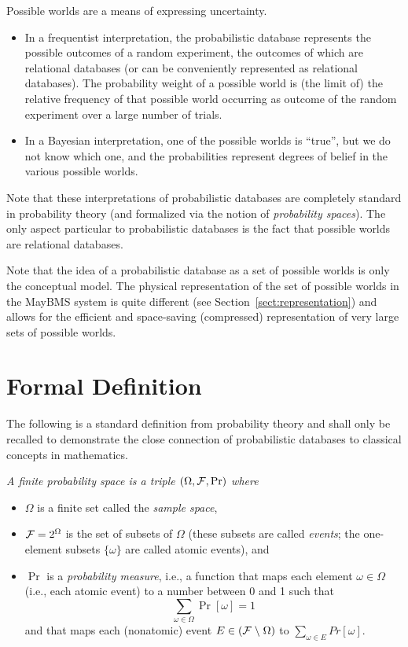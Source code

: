 Possible worlds are a means of expressing uncertainty.
\begin{itemize}
\item
In a frequentist interpretation, the probabilistic database represents the
possible outcomes of a random experiment, the outcomes of which are relational
databases (or can be conveniently represented as relational databases).
The probability weight of a possible world is (the limit of) the relative
frequency of that possible world occurring as outcome of the random experiment
over a large number of trials.

\item
In a Bayesian interpretation, one of the possible worlds is
``true'', but we do not know which one, and the probabilities represent
degrees of belief in the various possible worlds.
\end{itemize}

Note that these interpretations of probabilistic databases are completely
standard in probability theory (and formalized via the notion of {\em probability spaces}). The only aspect particular to probabilistic
databases is the fact that possible worlds are relational databases.


Note that the idea of a probabilistic database as a set of possible worlds
is only the conceptual model. The physical representation of the
set of possible worlds in the MayBMS system is quite different
(see Section~\ref{sect:representation}) and allows for the efficient and
space-saving (compressed) representation of very large sets of possible
worlds.


\section{Formal Definition}


The following is a standard definition from probability theory and
shall only be recalled to demonstrate the close connection of
probabilistic databases to classical concepts in mathematics.


\begin{definition}\em
A {\em finite probability space}\/ is a triple $(\Omega, {\cal F}, \Pr)$ where
\begin{itemize}
\item
$\Omega$ is a finite set called the {\em sample space}\/,

\item
${\cal F} = 2^\Omega$ is the set of
subsets of $\Omega$ (these subsets are called {\em events}; the one-element subsets $\{\omega\}$ are called atomic events), and

\item
$\Pr$ is a
{\em probability measure}\/, i.e., a function
that maps each element $\omega \in \Omega$ (i.e., each atomic event)
to a number between 0 and 1 such that
\[
\sum_{\omega \in \Omega} \Pr[\omega] = 1
\]
and that maps
each (nonatomic) event $E \in ({\cal F} \;\backslash\; \Omega)$ to
$\sum_{\omega \in E} Pr[\omega]$.
\punto
\end{itemize}
\end{definition}


